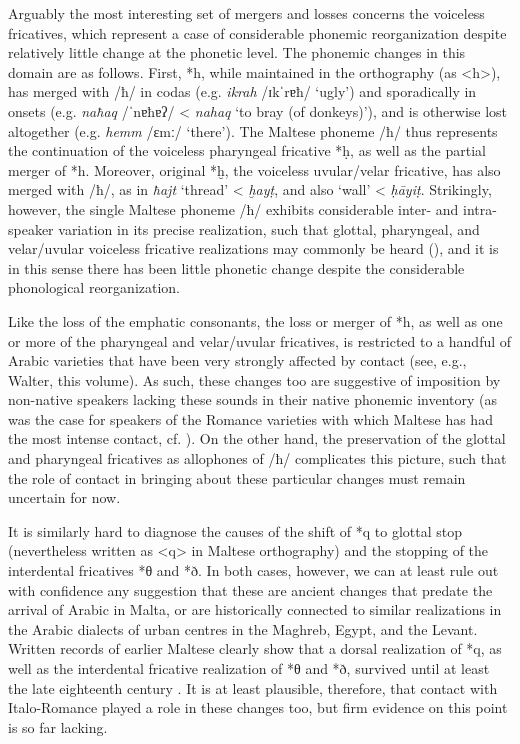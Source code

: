 \documentclass[output=paper]{langsci/langscibook}
\begin{document}
Arguably the most interesting set of mergers and losses concerns the voiceless fricatives, which represent a case of considerable phonemic reorganization despite relatively little change at the phonetic level. The phonemic changes in this domain are as follows. First, *h, while maintained in the orthography (as <h>), has merged with /ħ/ in codas (e.g. \textit{ikrah} /ɪkˈrɐħ/ `ugly') and sporadically in onsets (e.g. \textit{naħaq} /ˈnɐħɐʔ/ < \textit{nahaq} `to bray (of donkeys)'), and is otherwise lost altogether (e.g. \textit{hemm} /ɛmː/ `there'). The Maltese phoneme /ħ/ thus represents the continuation of the voiceless pharyngeal fricative *\d{h}, as well as the partial merger of *h. Moreover, original *ḫ, the voiceless uvular/velar fricative, has also merged with /ħ/, as in \textit{ħajt} `thread' < \textit{ḫay\d{t}}, and also `wall' < \textit{\d{h}\={a}yi\d{t}}. Strikingly, however, the single Maltese phoneme /ħ/ exhibits considerable inter- and intra-speaker variation in its precise realization, such that glottal, pharyngeal, and velar/uvular voiceless fricative realizations may commonly be heard (\citealt[301]{BorgAzzopardi-Alexander1997}), and it is in this sense there has been little phonetic change despite the considerable phonological reorganization.  

Like the loss of the emphatic consonants, the loss or merger of *h, as well as one or more of the pharyngeal and velar/uvular fricatives, is restricted to a handful of Arabic varieties that have been very strongly affected by contact (see, e.g., Walter, this volume). As such, these changes too are suggestive of imposition by non-native speakers lacking these sounds in their native phonemic inventory (as was the case for speakers of the Romance varieties with which Maltese has had the most intense contact, cf. \citealt[141--142] {Loporcaro2011}). On the other hand, the preservation of the glottal and pharyngeal fricatives as allophones of /ħ/ complicates this picture, such that the role of contact in bringing about these particular changes must remain uncertain for now. 

It is similarly hard to diagnose the causes of the shift of *q to glottal stop (nevertheless written as <q> in Maltese orthography) and the stopping of the interdental fricatives *θ and *ð. In both cases, however, we can at least rule out with confidence any suggestion that these are ancient changes that predate the arrival of Arabic in Malta, or are historically connected to similar realizations in the Arabic dialects of urban centres in the Maghreb, Egypt, and the Levant. Written records of earlier Maltese clearly show that a dorsal realization of *q, as well as the interdental fricative realization of *θ and *ð, survived until at least the late eighteenth century \citep{Avram2012,Avram2014Maltese}. It is at least plausible, therefore, that contact with Italo-Romance played a role in these changes too, but firm evidence on this point is so far lacking.
\end{document}
